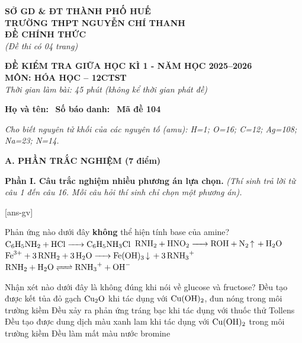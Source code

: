 \documentclass[12pt,a4paper]{article}
\begin{document}
\thispagestyle{firstpage}

\noindent
\begin{minipage}[t]{0.42\textwidth}
	\centering\fontsize{9.5pt}{12pt}\selectfont
	\textbf{SỞ GD \& ĐT THÀNH PHỐ HUẾ}\\
	\textbf{TRƯỜNG THPT NGUYỄN CHÍ THANH}\\
	\textbf{ĐỀ CHÍNH THỨC}\\
	\textit{(Đề thi có 04 trang)}
\end{minipage}\hfill
\begin{minipage}[t]{0.56\textwidth}
	\centering\small
	\textbf{ĐỀ KIỂM TRA GIỮA HỌC KÌ 1 - NĂM HỌC 2025--2026}\\
	\textbf{MÔN: HÓA HỌC -- 12CTST}\\
	\textit{Thời gian làm bài: 45 phút (không kể thời gian phát đề)}
\end{minipage}

\smallskip
\noindent\hrulefill
\smallskip

\noindent\textbf{Họ và tên:} \dotfill\ \textbf{Số báo danh:} \dotfill\ \textbf{Mã đề 104}

\smallskip
\noindent\textit{Cho biết nguyên tử khối của các nguyên tố (amu): H=1; O=16; C=12; Ag=108; Na=23; N=14.}
\smallskip

\noindent
\textbf{A. PHẦN TRẮC NGHIỆM (7 điểm)}

\smallskip
\noindent
\textbf{Phần I. Câu trắc nghiệm nhiều phương án lựa chọn.} \textit{(Thí sinh trả lời từ câu 1 đến câu 16. Mỗi câu hỏi thí sinh chỉ chọn một phương án).}

[ans-gv]

\begin{ex}
Phản ứng nào dưới đây \textbf{không} thể hiện tính base của amine?
\choice
{$\ce{C6H5NH2 + HCl -> C6H5NH3Cl}$}
{\True $\ce{RNH2 + HNO2 -> ROH + N2 ^ + H2O}$}
{$\ce{Fe^{3+} + 3RNH2 + 3H2O -> Fe(OH)3 v + 3RNH3^+}$}
{$\ce{RNH2 + H2O <=> RNH3^+ + OH^-}$}
\end{ex}

\begin{ex}
Nhận xét nào dưới đây là không đúng khi nói về glucose và fructose?
\choice
{Đều tạo được kết tủa đỏ gạch $\ce{Cu2O}$ khi tác dụng với $\ce{Cu(OH)2}$, đun nóng trong môi trường kiềm}
{Đều xảy ra phản ứng tráng bạc khi tác dụng với thuốc thử Tollens}
{Đều tạo được dung dịch màu xanh lam khi tác dụng với $\ce{Cu(OH)2}$ trong môi trường kiềm}
{\True Đều làm mất màu nước bromine}
\end{ex}
\end{document}
